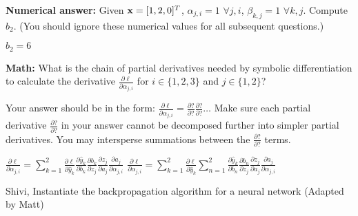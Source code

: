 \begin{parts}
\begin{subparts}


\subpart[2] \textbf{Numerical answer:} 
    Given $\mathbf{x} = [1, 2, 0]^T$, $\alpha_{j,i} = 1\,\,\forall j,i$, $\beta_{k,j} = 1\,\, \forall k,j$. Compute $b_2$. (You should ignore these numerical values for all subsequent questions.)

    \begin{tcolorbox}[fit,height=1cm, width=2cm, blank, borderline={1pt}{-2pt}]
    \end{tcolorbox}
    \begin{soln}
    $b_2 = 6$
    \end{soln}

\subpart[2] \textbf{Math:} What is the chain of partial derivatives needed by symbolic differentiation to calculate the derivative $\frac{\partial \ell}{\partial\alpha_{j,i}}$ for $i \in \{1, 2, 3\}$ and $j \in \{1, 2\}$?

    Your answer should be in the form: 
    $\frac{\partial \ell}{\partial \alpha_{j,i}} = \frac{\partial ?}{\partial ?} \frac{\partial ?}{\partial ?} \dots$
    Make sure each partial derivative $\frac{\partial ?}{\partial ?}$ in your answer cannot be decomposed further into simpler partial derivatives. You may intersperse summations between the $\frac{\partial ?}{\partial ?}$ terms.

    \begin{tcolorbox}[fit,height=3cm, width=15cm, blank, borderline={1pt}{-2pt},nobeforeafter]
    \begin{soln}
        $\frac{\partial \ell}{\partial \alpha_{j,i}} = \sum_{k=1}^2 
        \frac{\partial \ell}{\partial \hat{y}_k} 
        \frac{\partial \hat{y}_k}{\partial b_k}
        \frac{\partial b_k}{\partial z_j} 
        \frac{\partial z_j}{\partial a_j} 
        \frac{\partial a_j}{\partial \alpha_{j,i}}$ \newline \newline
        $\frac{\partial \ell}{\partial \alpha_{j,i}} = \sum_{k=1}^2 
        \frac{\partial \ell}{\partial \hat{y}_k}\sum_{n=1}^2 
        \frac{\partial \hat{y}_k}{\partial b_n} 
        \frac{\partial b_n}{\partial z_j} 
        \frac{\partial z_j}{\partial a_j} 
        \frac{\partial a_j}{\partial \alpha_{j,i}}$
    \end{soln}
    \end{tcolorbox}
    \begin{qauthor}
        Shivi, Instantiate the backpropagation algorithm for a neural network
        (Adapted by Matt)
    \end{qauthor}


\end{subparts}
\end{parts}
